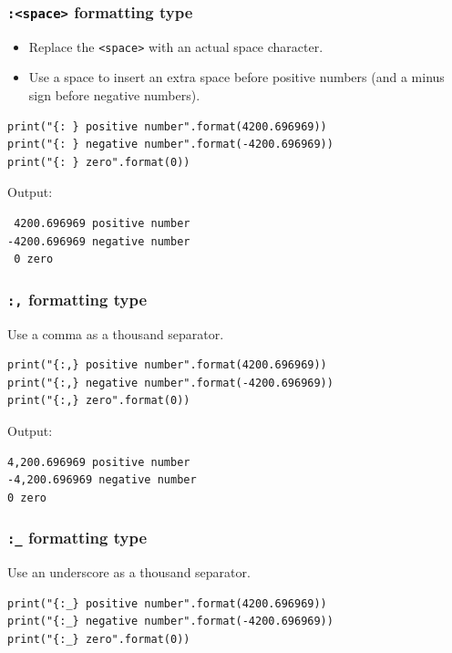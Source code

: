 \documentclass[11pt]{article}
\begin{document}
\subsubsection{\texttt{:<space>} formatting type}
\label{sec:org7b1e86a}
\begin{itemize}
\item Replace the \texttt{<space>} with an actual space character.
\item Use a space to insert an extra space before positive numbers (and a minus sign before negative numbers).
\end{itemize}

\begin{verbatim}
print("{: } positive number".format(4200.696969))
print("{: } negative number".format(-4200.696969))
print("{: } zero".format(0))
\end{verbatim}

 \noindent Output:

\begin{verbatim}
 4200.696969 positive number
-4200.696969 negative number
 0 zero
\end{verbatim}

\subsubsection{\texttt{:,} formatting type}
\label{sec:org22c9dd2}
Use a comma as a thousand separator.

\begin{verbatim}
print("{:,} positive number".format(4200.696969))
print("{:,} negative number".format(-4200.696969))
print("{:,} zero".format(0))
\end{verbatim}

 \noindent Output:

\begin{verbatim}
4,200.696969 positive number
-4,200.696969 negative number
0 zero
\end{verbatim}

\subsubsection{\texttt{:\_} formatting type}
\label{sec:org4a23871}
Use an underscore as a thousand separator.

\begin{verbatim}
print("{:_} positive number".format(4200.696969))
print("{:_} negative number".format(-4200.696969))
print("{:_} zero".format(0))
\end{verbatim}
\end{document}
